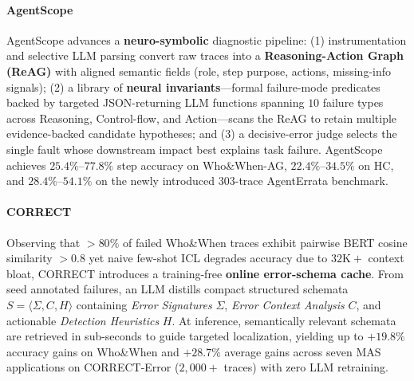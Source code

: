 \paragraph{AgentScope~\citep{bi2026agentscope}}
AgentScope advances a \textbf{neuro-symbolic} diagnostic pipeline: (1) instrumentation and selective LLM parsing convert raw traces into a \textbf{Reasoning-Action Graph (ReAG)} with aligned semantic fields (role, step purpose, actions, missing-info signals); (2) a library of \textbf{neural invariants}---formal failure-mode predicates backed by targeted JSON-returning LLM functions spanning $10$ failure types across Reasoning, Control-flow, and Action---scans the ReAG to retain multiple evidence-backed candidate hypotheses; and (3) a decisive-error judge selects the single fault whose downstream impact best explains task failure. AgentScope achieves $25.4\%$--$77.8\%$ step accuracy on Who\&When-AG, $22.4\%$--$34.5\%$ on HC, and $28.4\%$--$54.1\%$ on the newly introduced $303$-trace AgentErrata benchmark.

\paragraph{CORRECT~\citep{yu2026correct}}
Observing that $>80\%$ of failed Who\&When traces exhibit pairwise BERT cosine similarity $>0.8$ yet naive few-shot ICL degrades accuracy due to $32\text{K}+$ context bloat, CORRECT introduces a training-free \textbf{online error-schema cache}. From seed annotated failures, an LLM distills compact structured schemata $S = \langle \Sigma, C, H \rangle$ containing \emph{Error Signatures} $\Sigma$, \emph{Error Context Analysis} $C$, and actionable \emph{Detection Heuristics} $H$. At inference, semantically relevant schemata are retrieved in sub-seconds to guide targeted localization, yielding up to $+19.8\%$ accuracy gains on Who\&When and $+28.7\%$ average gains across seven MAS applications on CORRECT-Error ($2{,}000+$ traces) with zero LLM retraining.

